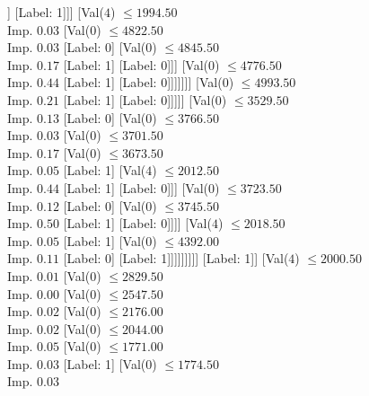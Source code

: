 \documentclass[margin=10pt]{standalone}
\begin{document}
\begin{forest}
																			[Val($0$) $ \leq 4543.00$ \\ Imp. $0.17$
																				[Label: 1]
																				[Label: 0]]
																			[Label: 1]]]
																	[Val($4$) $ \leq 1994.50$ \\ Imp. $0.03$
																		[Val($0$) $ \leq 4822.50$ \\ Imp. $0.03$
																			[Label: 0]
																			[Val($0$) $ \leq 4845.50$ \\ Imp. $0.17$
																				[Label: 1]
																				[Label: 0]]]
																		[Val($0$) $ \leq 4776.50$ \\ Imp. $0.44$
																			[Label: 1]
																			[Label: 0]]]]]]]
													[Val($0$) $ \leq 4993.50$ \\ Imp. $0.21$
														[Label: 1]
														[Label: 0]]]]]
										[Val($0$) $ \leq 3529.50$ \\ Imp. $0.13$
											[Label: 0]
											[Val($0$) $ \leq 3766.50$ \\ Imp. $0.03$
												[Val($0$) $ \leq 3701.50$ \\ Imp. $0.17$
													[Val($0$) $ \leq 3673.50$ \\ Imp. $0.05$
														[Label: 1]
														[Val($4$) $ \leq 2012.50$ \\ Imp. $0.44$
															[Label: 1]
															[Label: 0]]]
													[Val($0$) $ \leq 3723.50$ \\ Imp. $0.12$
														[Label: 0]
														[Val($0$) $ \leq 3745.50$ \\ Imp. $0.50$
															[Label: 1]
															[Label: 0]]]]
												[Val($4$) $ \leq 2018.50$ \\ Imp. $0.05$
													[Label: 1]
													[Val($0$) $ \leq 4392.00$ \\ Imp. $0.11$
														[Label: 0]
														[Label: 1]]]]]]]]]
						[Label: 1]]
					[Val($4$) $ \leq 2000.50$ \\ Imp. $0.01$
						[Val($0$) $ \leq 2829.50$ \\ Imp. $0.00$
							[Val($0$) $ \leq 2547.50$ \\ Imp. $0.02$
								[Val($0$) $ \leq 2176.00$ \\ Imp. $0.02$
									[Val($0$) $ \leq 2044.00$ \\ Imp. $0.05$
										[Val($0$) $ \leq 1771.00$ \\ Imp. $0.03$
											[Label: 1]
											[Val($0$) $ \leq 1774.50$ \\ Imp. $0.03$

\end{forest}
\end{document}
